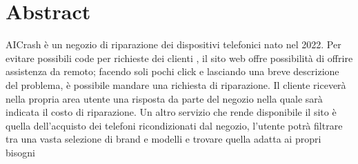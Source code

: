 \section*{Abstract}

AICrash è un negozio di riparazione dei dispositivi telefonici nato nel 2022. Per evitare
possibili code per richieste dei clienti , il sito web offre possibilità di offrire assistenza da remoto;
facendo soli pochi click e lasciando una breve descrizione del problema, è possibile mandare una richiesta 
di riparazione. Il cliente riceverà nella propria area utente una risposta da parte del negozio nella quale
sarà indicata il costo di riparazione.
Un altro servizio che rende disponibile il sito è quella dell'acquisto dei telefoni ricondizionati
dal negozio, l'utente potrà filtrare tra una vasta selezione di brand e modelli e trovare
quella adatta ai propri bisogni
